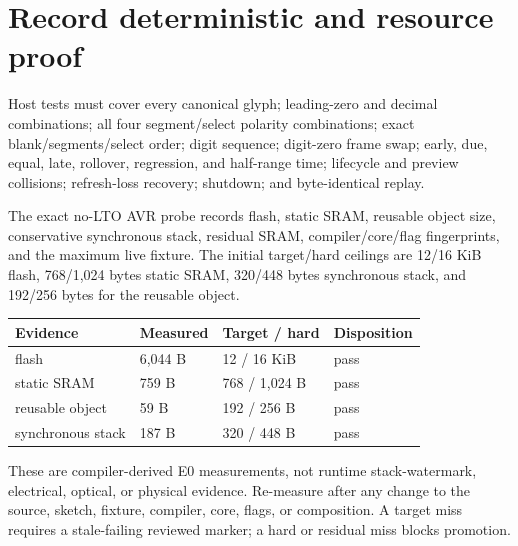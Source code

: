\documentclass[10pt]{article}
\begin{document}
\section{Record deterministic and resource proof}
Host tests must cover every canonical glyph; leading-zero and decimal
combinations; all four segment/select polarity combinations; exact
blank/segments/select order; digit sequence; digit-zero frame swap; early,
due, equal, late, rollover, regression, and half-range time; lifecycle and
preview collisions; refresh-loss recovery; shutdown; and byte-identical
replay.

The exact no-LTO AVR probe records flash, static SRAM, reusable object size,
conservative synchronous stack, residual SRAM, compiler/core/flag
fingerprints, and the maximum live fixture. The initial target/hard ceilings
are 12/16 KiB flash, 768/1,024 bytes static SRAM, 320/448 bytes synchronous
stack, and 192/256 bytes for the reusable object.

\begin{tabularx}{\linewidth}{@{}l l l X@{}}
\toprule
Evidence & Measured & Target / hard & Disposition\\
\midrule
flash & 6,044 B & 12 / 16 KiB & pass\\[7pt]
static SRAM & 759 B & 768 / 1,024 B & pass\\[7pt]
reusable object & 59 B & 192 / 256 B & pass\\[7pt]
synchronous stack & 187 B & 320 / 448 B & pass\\
\bottomrule
\end{tabularx}

These are compiler-derived E0 measurements, not runtime stack-watermark,
electrical, optical, or physical evidence. Re-measure after any change to the
source, sketch, fixture, compiler, core, flags, or composition. A target miss
requires a stale-failing reviewed marker; a hard or residual miss blocks
promotion.
\end{document}
